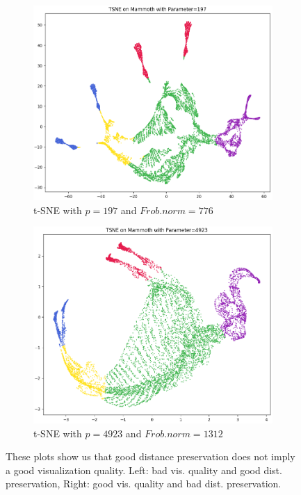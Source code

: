 \begin{figure}[!]
     \centering
     \begin{subfigure}[t]{0.49\columnwidth}
    	\centering
    	\includegraphics[width=\columnwidth]{images/mammoth_tsne197_plot.png}
    	\caption{t-SNE with $p=197$ and $Frob. norm=776$}
        \label{fig:mammoth_tsne197_plot}
    \end{subfigure}
     \hfill
     \begin{subfigure}[t]{0.49\columnwidth}
    	\centering
    	\includegraphics[width=\columnwidth]{images/mammoth_tsne4923_plot.png}
    	\caption{t-SNE with $p=4923$ and $Frob. norm=1312$}
        \label{fig:mammoth_tsne4923_plot}
    \end{subfigure}
     \caption[Visualisation Quality of Embeddings]{These plots show us that good distance preservation does not imply a good visualization quality. Left: bad vis. quality and good dist. preservation, Right: good vis. quality and bad dist. preservation.}
    \label{fig:visualisation_quality}
\end{figure}

